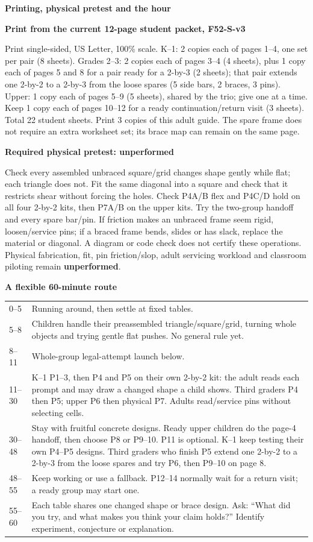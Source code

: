 \documentclass[letterpaper,11pt]{article}
\newcommand{\titleline}[1]{\par{\large\bfseries #1}\par}
\newcommand{\sub}[1]{\par\textbf{#1}\par}
\begin{document}
\newpage
\titleline{Printing, physical pretest and the hour}
\sub{Print from the current 12-page student packet, F52-S-v3}
Print single-sided, US Letter, 100\% scale. K--1: 2 copies each of pages 1--4, one set per pair (8 sheets). Grades 2--3: 2 copies each of pages 3--4 (4 sheets), plus 1 copy each of pages 5 and 8 for a pair ready for a 2-by-3 (2 sheets); that pair extends one 2-by-2 to a 2-by-3 from the loose spares (5 side bars, 2 braces, 3 pins). Upper: 1 copy each of pages 5--9 (5 sheets), shared by the trio; give one at a time. Keep 1 copy each of pages 10--12 for a ready continuation/return visit (3 sheets). Total 22 student sheets. Print 3 copies of this adult guide. The spare frame does not require an extra worksheet set; its brace map can remain on the same page.

\sub{Required physical pretest: unperformed}
Check every assembled unbraced square/grid changes shape gently while flat; each triangle does not. Fit the same diagonal into a square and check that it restricts shear without forcing the holes. Check P4A/B flex and P4C/D hold on all four 2-by-2 kits, then P7A/B on the upper kits. Try the two-group handoff and every spare bar/pin. If friction makes an unbraced frame seem rigid, loosen/service pins; if a braced frame bends, slides or has slack, replace the material or diagonal. A diagram or code check does not certify these operations. Physical fabrication, fit, pin friction/slop, adult servicing workload and classroom piloting remain \textbf{unperformed}.

\sub{A flexible 60-minute route}
\begin{tabularx}{\linewidth}{@{}lX@{}}0--5 & Running around, then settle at fixed tables.\\
5--8 & Children handle their preassembled triangle/square/grid, turning whole objects and trying gentle flat pushes. No general rule yet.\\
8--11 & Whole-group legal-attempt launch below.\\
11--30 & K--1 P1--3, then P4 and P5 on their own 2-by-2 kit: the adult reads each prompt and may draw a changed shape a child shows. Third graders P4 then P5; upper P6 then physical P7. Adults read/service pins without selecting cells.\\
30--48 & Stay with fruitful concrete designs. Ready upper children do the page-4 handoff, then choose P8 or P9--10. P11 is optional. K--1 keep testing their own P4--P5 designs. Third graders who finish P5 extend one 2-by-2 to a 2-by-3 from the loose spares and try P6, then P9--10 on page 8.\\
48--55 & Keep working or use a fallback. P12--14 normally wait for a return visit; a ready group may start one.\\
55--60 & Each table shares one changed shape or brace design. Ask: ``What did you try, and what makes you think your claim holds?'' Identify experiment, conjecture or explanation.
\end{tabularx}
\end{document}
